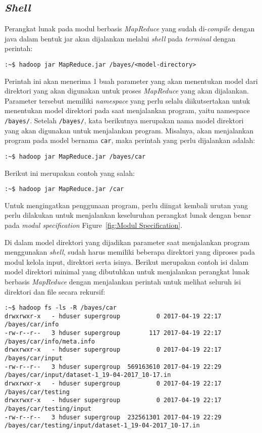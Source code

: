 \subsection{\textit{Shell}}
Perangkat lunak pada modul berbasis \textit{MapReduce} yang sudah di-\textit{compile} dengan java dalam bentuk jar akan dijalankan melalui \textit{shell} pada \textit{terminal} dengan perintah:
\begin{lstlisting}
:~$ hadoop jar MapReduce.jar /bayes/<model-directory>
\end{lstlisting}
Perintah ini akan menerima 1 buah parameter yang akan menentukan model dari direktori yang akan digunakan untuk proses \textit{MapReduce} yang akan dijalankan. Parameter tersebut memiliki \textit{namespace} yang perlu selalu diikutsertakan untuk menentukan model direktori pada saat menjalankan program, yaitu namespace \texttt{/bayes/}. Setelah \texttt{/bayes/}, kata berikutnya merupakan nama model direktori yang akan digunakan untuk menjalankan program. Misalnya, akan menjalankan program pada model bernama \texttt{car}, maka perintah yang perlu dijalankan adalah:
\begin{lstlisting}
:~$ hadoop jar MapReduce.jar /bayes/car
\end{lstlisting}
Berikut ini merupakan contoh yang salah:
\begin{lstlisting}
:~$ hadoop jar MapReduce.jar /car
\end{lstlisting}

Untuk mengingatkan penggunaan program, perlu diingat kembali urutan yang perlu dilakukan untuk menjalankan keseluruhan perangkat lunak dengan benar pada \textit{modul specification} Figure~\ref{fig:Modul Specification}. 

Di dalam model direktori yang dijadikan parameter saat menjalankan program menggunakan \textit{shell}, sudah harus memiliki beberapa direktori yang diproses pada modul kelola input, direktori serta isinya. Berikut merupakan contoh isi dalam model direktori minimal yang dibutuhkan untuk menjalankan perangkat lunak berbasis \textit{MapReduce} dengan menjalankan perintah untuk melihat seluruh isi direktori dan file secara rekursif:
\begin{lstlisting}
:~$ hadoop fs -ls -R /bayes/car
drwxrwxr-x   - hduser supergroup          0 2017-04-19 22:17 /bayes/car/info
-rw-r--r--   3 hduser supergroup        117 2017-04-19 22:17 /bayes/car/info/meta.info
drwxrwxr-x   - hduser supergroup          0 2017-04-19 22:17 /bayes/car/input
-rw-r--r--   3 hduser supergroup  569163610 2017-04-19 22:29 /bayes/car/input/dataset-1_19-04-2017_10-17.in
drwxrwxr-x   - hduser supergroup          0 2017-04-19 22:17 /bayes/car/testing
drwxrwxr-x   - hduser supergroup          0 2017-04-19 22:17 /bayes/car/testing/input
-rw-r--r--   3 hduser supergroup  232561301 2017-04-19 22:29 /bayes/car/testing/input/dataset-1_19-04-2017_10-17.in
\end{lstlisting}

